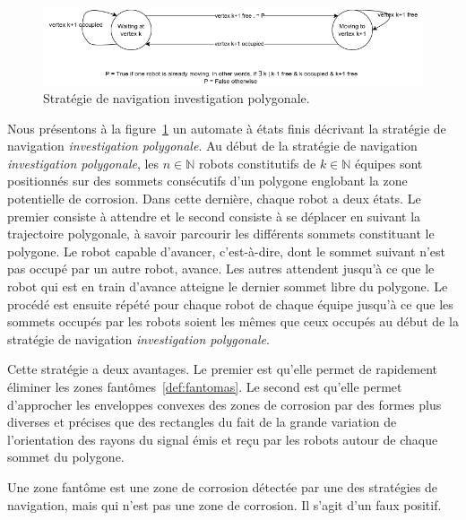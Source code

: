 \documentclass[francais,RandD]{rapportPFE}
\begin{document}
				\begin{figure}[h!]
					\centering
					\includegraphics[scale=0.6]{graphics/automat_poly.png}
					\caption{Stratégie de navigation investigation polygonale.}
					\label{fig:automat}
				\end{figure}

				Nous présentons à la figure~\ref{fig:automat} un automate à états finis décrivant la stratégie de navigation \textit{investigation polygonale}.
				Au début de la stratégie de navigation \textit{investigation polygonale}, les $n \in \mathbb{N}$ robots constitutifs de $k \in \mathbb{N}$ équipes sont positionnés sur des sommets consécutifs d'un polygone englobant la zone potentielle de corrosion.
				Dans cette dernière, chaque robot a deux états.
				Le premier consiste à attendre et le second consiste à se déplacer en suivant la trajectoire polygonale, à savoir parcourir les différents sommets constituant le polygone.
				Le robot capable d'avancer, c'est-à-dire, dont le sommet suivant n'est pas occupé par un autre robot, avance.
				Les autres attendent jusqu'à ce que le robot qui est en train d'avance atteigne le dernier sommet libre du polygone.
				Le procédé est ensuite répété pour chaque robot de chaque équipe jusqu'à ce que les sommets occupés par les robots soient les mêmes que ceux occupés au début de la stratégie de navigation \textit{investigation polygonale}.

				Cette stratégie a deux avantages.
				Le premier est qu'elle permet de rapidement éliminer les zones fantômes~\ref{def:fantomas}.
				Le second est qu'elle permet d'approcher les enveloppes convexes des zones de corrosion par des formes plus diverses et précises que des rectangles du fait de la grande variation de l'orientation des rayons du signal émis et reçu par les robots autour de chaque sommet du polygone.

				\begin{Definition}
					\label{def:fantomas}
					Une zone fantôme est une zone de corrosion détectée par une des stratégies de navigation, mais qui n'est pas une zone de corrosion. Il s'agit d'un faux positif.
				\end{Definition}
\end{document}
